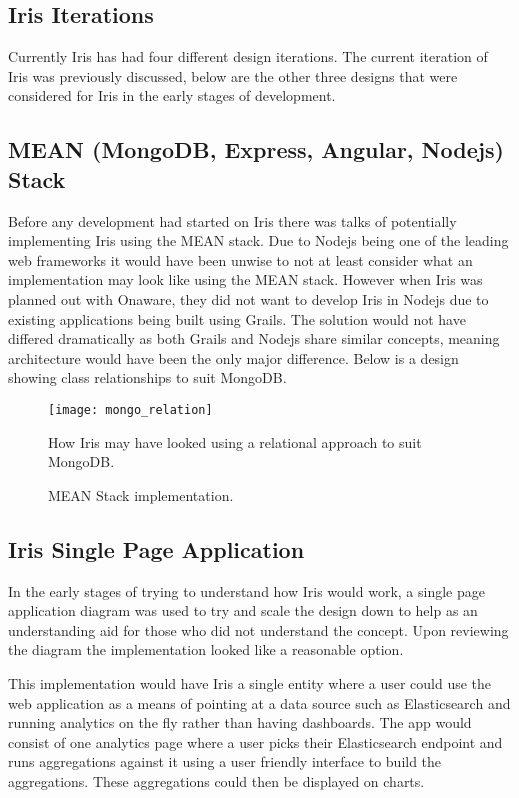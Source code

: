 \documentclass[12pt,a4paper,titlepage]{report}
\begin{document}
\begin{appendices}

\chapter{Iris Iterations}\label{sec:iterations}

Currently Iris has had four different design iterations. The current iteration of Iris was previously discussed, below are the other three designs that were considered for Iris in the early stages of development.

\section{ MEAN (MongoDB, Express, Angular, Nodejs) Stack}

Before any development had started on Iris there was talks of potentially implementing Iris using the MEAN stack. Due to Nodejs being one of the leading web frameworks it would have been unwise to not at least consider what an implementation may look like using the MEAN stack. However when Iris was planned out with Onaware, they did not want to develop Iris in Nodejs due to existing applications being built using Grails. The solution would not have differed dramatically as both Grails and Nodejs share similar concepts, meaning architecture would have been the only major difference. Below is a design showing class relationships to suit MongoDB.

\begin{figure}[H]
\begin{tcolorbox}
\centerline{\texttt{[image: mongo\_relation]}}
How Iris may have looked using a relational approach to suit MongoDB.
\end{tcolorbox}
\caption{MEAN Stack implementation.}
\end{figure}

\section{Iris Single Page Application}

In the early stages of trying to understand how Iris would work, a single page application diagram was used to try and scale the design down to help as an understanding aid for those who did not understand the concept. Upon reviewing the diagram the implementation looked like a reasonable option. 

This implementation would have Iris a single entity where a user could use the web application as a means of pointing at a data source such as Elasticsearch and running analytics on the fly rather than having dashboards. The app would consist of one analytics page where a user picks their Elasticsearch endpoint and runs aggregations against it using a user friendly interface to build the aggregations. These aggregations could then be displayed on charts.


\end{appendices}
\end{document}
